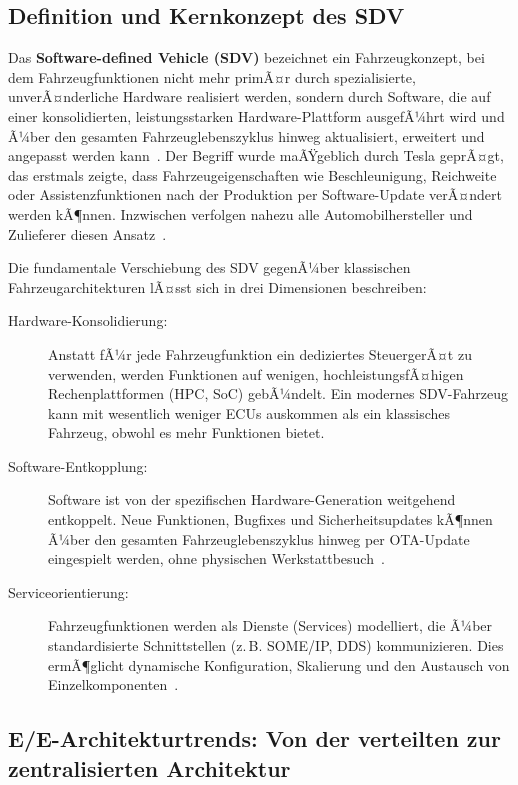 ﻿\documentclass[12pt,a4paper,twoside]{article}
\begin{document}
\subsection{Definition und Kernkonzept des SDV}
\label{subsec:sdv_definition}

Das \textbf{Software-defined Vehicle (SDV)} bezeichnet ein Fahrzeugkonzept,
bei dem Fahrzeugfunktionen nicht mehr primÃ¤r durch spezialisierte, unverÃ¤nderliche
Hardware realisiert werden, sondern durch Software, die auf einer konsolidierten,
leistungsstarken Hardware-Plattform ausgefÃ¼hrt wird und Ã¼ber den gesamten
Fahrzeuglebenszyklus hinweg aktualisiert, erweitert und angepasst werden
kann~\cite{kugele2018sdv}. Der Begriff wurde maÃŸgeblich durch Tesla geprÃ¤gt,
das erstmals zeigte, dass Fahrzeugeigenschaften wie Beschleunigung, Reichweite
oder Assistenzfunktionen nach der Produktion per Software-Update verÃ¤ndert werden
kÃ¶nnen. Inzwischen verfolgen nahezu alle Automobilhersteller und Zulieferer
diesen Ansatz~\cite{halder2020secure}.

Die fundamentale Verschiebung des SDV gegenÃ¼ber klassischen Fahrzeugarchitekturen
lÃ¤sst sich in drei Dimensionen beschreiben:

\begin{description}
  \item[Hardware-Konsolidierung:] Anstatt fÃ¼r jede Fahrzeugfunktion ein dediziertes
    SteuergerÃ¤t zu verwenden, werden Funktionen auf wenigen, hochleistungsfÃ¤higen
    Rechenplattformen (HPC, SoC) gebÃ¼ndelt. Ein modernes SDV-Fahrzeug kann mit
    wesentlich weniger ECUs auskommen als ein klassisches Fahrzeug, obwohl es mehr
    Funktionen bietet.
  \item[Software-Entkopplung:] Software ist von der spezifischen Hardware-Generation
    weitgehend entkoppelt. Neue Funktionen, Bugfixes und Sicherheitsupdates kÃ¶nnen
    Ã¼ber den gesamten Fahrzeuglebenszyklus hinweg per OTA-Update eingespielt werden,
    ohne physischen Werkstattbesuch~\cite{nilsson2008key}.
  \item[Serviceorientierung:] Fahrzeugfunktionen werden als Dienste (Services)
    modelliert, die Ã¼ber standardisierte Schnittstellen (z.\,B. SOME/IP, DDS)
    kommunizieren. Dies ermÃ¶glicht dynamische Konfiguration, Skalierung und
    den Austausch von Einzelkomponenten~\cite{zelle2020security}.
\end{description}

\subsection{E/E-Architekturtrends: Von der verteilten zur zentralisierten Architektur}
\label{subsec:ee_architektur}
\end{document}
